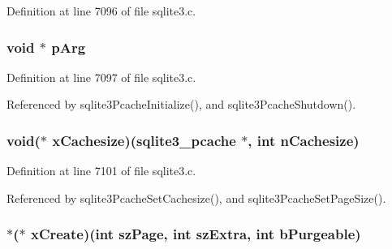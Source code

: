 Definition at line 7096 of file sqlite3.\+c.

\hypertarget{structsqlite3__pcache__methods2_a3717fa60d029e21cf1253154e5bdd969}{}
\subsubsection[{p\+Arg}]{\setlength{\rightskip}{0pt plus 5cm}void $\ast$ p\+Arg}\label{structsqlite3__pcache__methods2_a3717fa60d029e21cf1253154e5bdd969}


Definition at line 7097 of file sqlite3.\+c.



Referenced by sqlite3\+Pcache\+Initialize(), and sqlite3\+Pcache\+Shutdown().

\hypertarget{structsqlite3__pcache__methods2_a1a71e7cecb9abff1fcc9594e0120091b}{}
\subsubsection[{x\+Cachesize}]{\setlength{\rightskip}{0pt plus 5cm}void($\ast$ x\+Cachesize)({\bf sqlite3\+\_\+pcache} $\ast$, int n\+Cachesize)}\label{structsqlite3__pcache__methods2_a1a71e7cecb9abff1fcc9594e0120091b}


Definition at line 7101 of file sqlite3.\+c.



Referenced by sqlite3\+Pcache\+Set\+Cachesize(), and sqlite3\+Pcache\+Set\+Page\+Size().

\hypertarget{structsqlite3__pcache__methods2_ab9a93020ba292bd881352f4e04235541}{}
\subsubsection[{x\+Create}]{ $\ast$($\ast$ x\+Create)(int sz\+Page, int sz\+Extra, int b\+Purgeable)}\label{structsqlite3__pcache__methods2_ab9a93020ba292bd881352f4e04235541}


